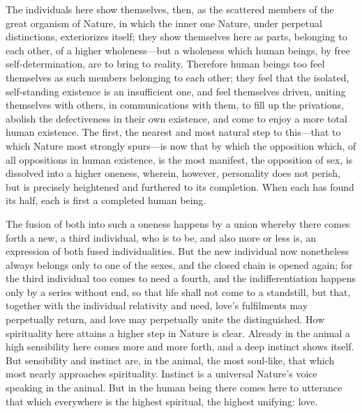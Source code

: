 \documentclass[12pt,a4paper]{book}
\begin{document}
The individuals here show themselves,
then, as the scattered members of the great organism of Nature, in which
the inner one Nature, under perpetual distinctions, exteriorizes itself;
they show themselves here as parts, belonging to each other, of a higher
wholeness---but a wholeness which human beings, by free self-determination,
are to bring to reality. Therefore human beings too feel themselves as such
members belonging to each other; they feel that the isolated, self-standing
existence is an insufficient one, and feel themselves driven, uniting
themselves with others, in communications with them, to fill up the
privations, abolish the defectiveness in their own existence, and come to
enjoy a more total human existence. The first, the nearest and most natural
step to this---that to which Nature most strongly spurs---is now that by
which the opposition which, of all oppositions in human existence, is the
most manifest, the opposition of sex, is dissolved into a higher oneness,
wherein, however, personality does not perish, but is precisely heightened
and furthered to its completion. When each has found its half, each is
first a completed human being.

The fusion of both into such a oneness happens by a union whereby there
comes forth a new, a third individual, who is to be, and also more or less
is, an expression of both fused individualities. But the new individual now
nonetheless always belongs only to one of the sexes, and the closed chain
is opened again; for the third individual too comes to need a fourth, and
the indifferentiation happens only by a series without end, so that life
shall not come to a standstill, but that, together with the individual
relativity and need, love's fulfilments may perpetually return, and love
may perpetually unite the distinguished. How spirituality here attains a
higher step in Nature is clear. Already in the animal a high sensibility
here comes more and more forth, and a deep instinct shows itself. But
sensibility and instinct are, in the animal, the most soul-like, that which
most nearly approaches spirituality. Instinct is a universal Nature's voice
speaking in the animal. But in the human being there comes here to
utterance that which everywhere is the highest spiritual, the highest
unifying: love.
\end{document}

